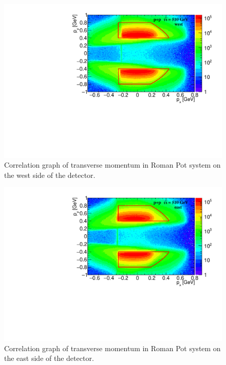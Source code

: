 \FloatBarrier
\begin{figure}[ht]
    \centering
    \includegraphics[width=1\textwidth]{figures/hRPcorrWest.pdf}
    \caption[Correlation graph of transverse momentum in Roman Pot system on the west side of the detector]{Correlation graph of transverse momentum in Roman Pot system on the west side of the detector.}
    \label{af4}
\end{figure}
\FloatBarrier

\FloatBarrier
\begin{figure}[ht]
    \centering
    \includegraphics[width=1\textwidth]{figures/hRPcorrEast.pdf}
    \caption[Correlation graph of transverse momentum in Roman Pot system on the east side of the detector]{Correlation graph of transverse momentum in Roman Pot system on the east side of the detector.}
    \label{af17}
\end{figure}
\FloatBarrier
